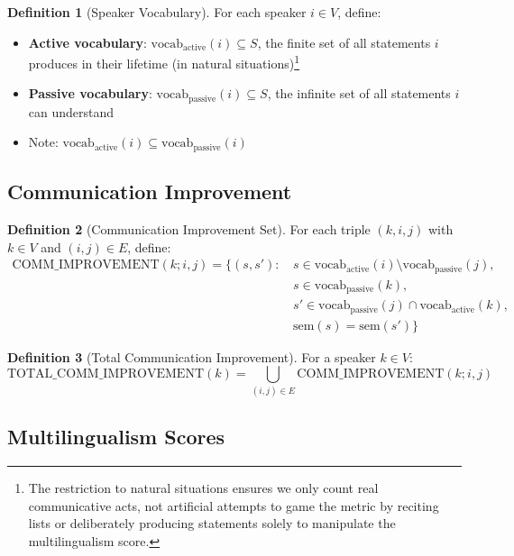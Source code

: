 \documentclass[12pt,a4paper]{article}
\theoremstyle{definition}
\newtheorem{definition}{Definition}
\begin{document}
\begin{definition}[Speaker Vocabulary]
For each speaker $i \in V$, define:
\begin{itemize}
    \item \textbf{Active vocabulary}: $\text{vocab}_{\text{active}}(i) \subseteq S$, the finite set of all statements $i$ produces in their lifetime (in natural situations)\footnote{The restriction to natural situations ensures we only count real communicative acts, not artificial attempts to game the metric by reciting lists or deliberately producing statements solely to manipulate the multilingualism score.}
    \item \textbf{Passive vocabulary}: $\text{vocab}_{\text{passive}}(i) \subseteq S$, the infinite set of all statements $i$ can understand
    \item Note: $\text{vocab}_{\text{active}}(i) \subseteq \text{vocab}_{\text{passive}}(i)$
\end{itemize}
\end{definition}

\subsection{Communication Improvement}

\begin{definition}[Communication Improvement Set]
For each triple $(k,i,j)$ with $k \in V$ and $(i,j) \in E$, define:
\begin{align}
\text{COMM\_IMPROVEMENT}(k; i,j) = \bigg\{(s,s') :
& \, s \in \text{vocab}_{\text{active}}(i) \setminus \text{vocab}_{\text{passive}}(j), \nonumber \\
& \, s \in \text{vocab}_{\text{passive}}(k), \nonumber \\
& \, s' \in \text{vocab}_{\text{passive}}(j) \cap \text{vocab}_{\text{active}}(k), \nonumber \\
& \, \text{sem}(s) = \text{sem}(s') \bigg\}
\end{align}
\end{definition}

\begin{definition}[Total Communication Improvement]
For a speaker $k \in V$:
\begin{equation}
\text{TOTAL\_COMM\_IMPROVEMENT}(k) = \bigcup_{(i,j) \in E} \text{COMM\_IMPROVEMENT}(k; i,j)
\end{equation}
\end{definition}

\subsection{Multilingualism Scores}
\end{document}
